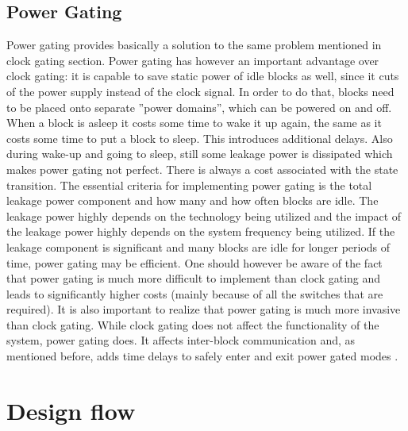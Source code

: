  \subsection{Power Gating}
 Power gating provides basically a solution to the same problem mentioned in clock gating section. Power gating has however an important advantage over clock gating: it is capable to save static power of idle blocks as well, since it cuts of the power supply instead of 
 the clock signal. In order to do that, blocks need to be placed onto separate ”power domains”, which can be powered on and off. When a block is asleep it costs some time to wake it up again, the same as it costs 
 some time to put a block to sleep. This introduces additional delays. Also during wake-up and going to sleep, still some leakage power is dissipated which makes power gating not perfect. There is always a cost associated with the state transition. The essential criteria for implementing power gating is the total leakage power component and how many and how often blocks are idle. The leakage power highly depends on the technology being utilized and the impact of the leakage 
 power highly depends on the system frequency being utilized. If the leakage component is significant and many blocks are idle for longer periods of time, power gating may be efficient. One should however be aware of the fact that power gating is much more difficult to implement than clock gating and leads to significantly higher costs (mainly because of all the switches that are required). It is also important to realize that power 
 gating is much more invasive than clock gating. While clock gating does not affect the functionality of the system, power gating does. It affects inter-block communication and, as mentioned before, adds time delays to safely enter and exit power gated modes \cite{LowPowerMethod}. 
 
 \section{Design flow}
 \label{sec:designFlow}
 
